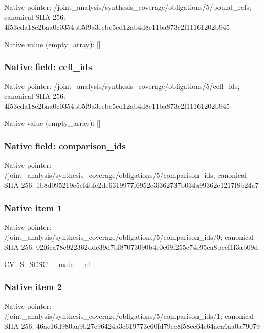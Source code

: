 \documentclass[10pt,a4paper]{article}
\begin{document}
Native pointer: /joint\_analysis/synthesi\allowbreak{}s\_coverage/obligations/5\allowbreak{}/bound\_refs; canonical SHA-256: 4f53cda18c2baa0c0354bb5f\allowbreak{}9a3ecbe5ed12ab4d8e11ba87\allowbreak{}3c2f11161202b945



Native value (empty\_array): []



\subsubsection{Native field: cell\_ids}


Native pointer: /joint\_analysis/synthesi\allowbreak{}s\_coverage/obligations/5\allowbreak{}/cell\_ids; canonical SHA-256: 4f53cda18c2baa0c0354bb5f\allowbreak{}9a3ecbe5ed12ab4d8e11ba87\allowbreak{}3c2f11161202b945



Native value (empty\_array): []



\subsubsection{Native field: comparison\_ids}


Native pointer: /joint\_analysis/synthesi\allowbreak{}s\_coverage/obligations/5\allowbreak{}/comparison\_ids; canonical SHA-256: 1b8d095219e5ef4bfe2de631\allowbreak{}9977f6952e3f362737b034a9\allowbreak{}9362e1217f8b24a7



\subsubsection{Native item 1}


Native pointer: /joint\_analysis/synthesi\allowbreak{}s\_coverage/obligations/5\allowbreak{}/comparison\_ids/0; canonical SHA-256: 02f6ca78c922362ddc39d7bf\allowbreak{}87073090b4e0e69f255c74c9\allowbreak{}5ca8beef1f3ab09d


CV\_S\_SCSC\_\_main\_\_c1


\subsubsection{Native item 2}


Native pointer: /joint\_analysis/synthesi\allowbreak{}s\_coverage/obligations/5\allowbreak{}/comparison\_ids/1; canonical SHA-256: 46ae16d980aa9b27e96424a3\allowbreak{}c619773c60fd79ce8f58ce64\allowbreak{}e64aea6aa0a79079
\end{document}
